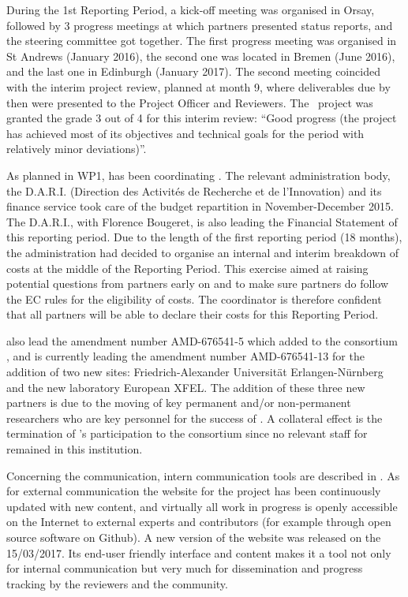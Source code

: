\documentclass{deliverablereport}
\begin{document}
During the 1st Reporting Period, a kick-off meeting was organised in Orsay, followed by
3 progress meetings at which partners presented status reports, and
the steering committee got together.  The first progress meeting was
organised in St Andrews (January 2016), the second one was located
in Bremen (June 2016), and the last one in Edinburgh (January 2017). The second meeting coincided with the interim project
review, planned at month 9, where deliverables due by then were
presented to the Project Officer and Reviewers. The \ODK\ project was
granted the grade 3 out of 4 for this interim review: ``Good progress
(the project has achieved most of its objectives and technical goals
for the period with relatively minor deviations)''.

As planned in WP1,  has been coordinating \ODK.  The  relevant administration body, the D.A.R.I. (Direction des Activités de Recherche et de l'Innovation) and its finance service took care of the budget repartition in November-December 2015. The D.A.R.I., with Florence Bougeret, is also leading the Financial Statement of this reporting period. Due to the length of the first reporting period (18 months), the  administration had decided to organise an internal and interim
breakdown of costs at the middle of the Reporting Period. This exercise aimed at raising potential questions
from partners early on and to make sure partners do follow the EC
rules for the eligibility of costs. The coordinator is therefore confident that all partners will be able to declare their costs for this Reporting Period.

 also lead the amendment number AMD-676541-5 which added to the consortium , and is currently leading the amendment number AMD-676541-13 for the addition of two new sites: Friedrich-Alexander Universität Erlangen-Nürnberg and the new laboratory European XFEL. The addition of these three new partners is due to the moving of key permanent and/or non-permanent researchers who are key personnel for the success of \ODK. A collateral effect is the termination of 's participation to the consortium since no relevant staff for \ODK remained in this institution.


Concerning the communication, intern communication tools are described
in . As for external
communication the website for the project has been continuously
updated with new content, and virtually all work in progress is openly
accessible on the Internet to external experts and contributors (for
example through open source software on Github). A new version of the
website was released on the 15/03/2017. Its end-user friendly
interface and content makes it a tool not only for internal
communication but very much for dissemination and progress tracking by
the reviewers and the community.
\end{document}
